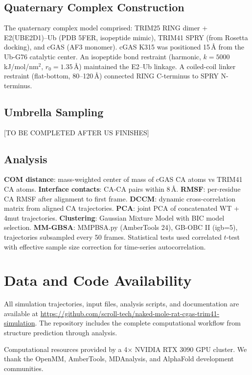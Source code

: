 \documentclass[journal=jcisd8, manuscript=article]{achemso}
\begin{document}
\subsection{Quaternary Complex Construction}

The quaternary complex model comprised: TRIM25 RING dimer + E2(UBE2D1)--Ub (PDB 5FER, isopeptide mimic), TRIM41 SPRY (from Rosetta docking), and cGAS (AF3 monomer). cGAS K315 was positioned 15\,\AA{} from the Ub-G76 catalytic center. An isopeptide bond restraint (harmonic, $k = 5000$ kJ/mol/nm$^2$, $r_0 = 1.35$\,\AA) maintained the E2--Ub linkage. A coiled-coil linker restraint (flat-bottom, 80--120\,\AA) connected RING C-terminus to SPRY N-terminus.

\subsection{Umbrella Sampling}

[TO BE COMPLETED AFTER US FINISHES]

\subsection{Analysis}

\textbf{COM distance}: mass-weighted center of mass of cGAS CA atoms vs TRIM41 CA atoms. \textbf{Interface contacts}: CA-CA pairs within 8\,\AA. \textbf{RMSF}: per-residue CA RMSF after alignment to first frame. \textbf{DCCM}: dynamic cross-correlation matrix from aligned CA trajectories. \textbf{PCA}: joint PCA of concatenated WT + 4mut trajectories. \textbf{Clustering}: Gaussian Mixture Model with BIC model selection. \textbf{MM-GBSA}: MMPBSA.py (AmberTools 24), GB-OBC II (igb=5), trajectories subsampled every 50 frames. Statistical tests used correlated $t$-test with effective sample size correction for time-series autocorrelation.

\section{Data and Code Availability}

All simulation trajectories, input files, analysis scripts, and documentation are available at \url{https://github.com/scroll-tech/naked-mole-rat-cgas-trim41-simulation}. The repository includes the complete computational workflow from structure prediction through analysis.

\begin{acknowledgement}
Computational resources provided by a 4$\times$ NVIDIA RTX 3090 GPU cluster. We thank the OpenMM, AmberTools, MDAnalysis, and AlphaFold development communities.
\end{acknowledgement}
\end{document}
